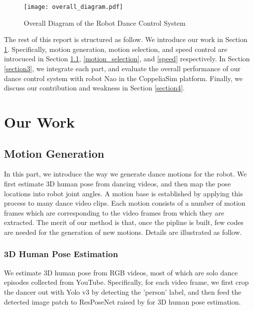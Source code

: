 \documentclass[UTF8,a4paper]{article}
\begin{document}
	\begin{figure}[htb]
		\centering
		\texttt{[image: overall\_diagram.pdf]}
		\caption{Overall Diagram of the Robot Dance Control System}
		\label{overall}
	\end{figure}

	The rest of this report is structured as follow. We introduce our work in Section \ref{section2}. Specifically, motion generation, motion selection, and speed control are introcuced in Section \ref{motion_generate}, \ref{motion_selection}, and \ref{speed} respectively. In Section \ref{section3}, we integrate each part, and evaluate the overall performance of our dance control system with robot Nao in the CoppeliaSim platform. Finally, we discuss our contribution and weakness in Section \ref{section4}.
	
	\section{Our Work}\label{section2}

	\subsection{Motion Generation}\label{motion_generate}

	\noindent In this part, we introduce the way we generate dance motions for the robot. We first estimate 3D human pose from dancing videos, and then map the pose locations into robot joint angles. A motion base is established by applying this process to many dance video clips. Each motion consists of a number of motion frames which are corresponding to the video frames from which they are extracted. The merit of our method is that, once the pipline is built, few codes are  needed for the generation of new motions. Details are illustrated as follow.

	\subsubsection{3D Human Pose Estimation}

	\noindent We estimate 3D human pose from RGB videos, most of which are solo dance episodes collected from YouTube. Specifically, for each video frame, we first crop the dancer out with Yolo v3\cite{redmon2018yolov3} by detecting the 'person' label, and then feed the detected image patch to ResPoseNet raised by \cite{moon2019camera} for 3D human pose estimation.
	
\end{document}
